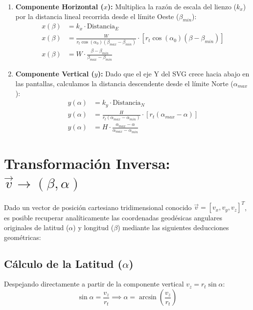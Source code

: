 \documentclass[12pt,a4paper]{article}
\begin{document}
\begin{enumerate}
    \item \textbf{Componente Horizontal ($x$):} Multiplica la razón de escala del lienzo ($k_x$) por la distancia lineal recorrida desde el límite Oeste ($\beta_{min}$):
    \begin{align}
        x(\beta) &= k_x \cdot \text{Distancia}_E \nonumber \\
        x(\beta) &= \frac{W}{r_t \cos(\alpha_0)(\beta_{max} - \beta_{min})} \cdot \left[ r_t \cos(\alpha_0)(\beta - \beta_{min}) \right] \nonumber \\
        x(\beta) &= W \cdot \frac{\beta - \beta_{min}}{\beta_{max} - \beta_{min}}
    \end{align}

    \item \textbf{Componente Vertical ($y$):} Dado que el eje Y del SVG crece hacia abajo en las pantallas, calculamos la distancia descendente desde el límite Norte ($\alpha_{max}$):
    \begin{align}
        y(\alpha) &= k_y \cdot \text{Distancia}_N \nonumber \\
        y(\alpha) &= \frac{H}{r_t (\alpha_{max} - \alpha_{min})} \cdot \left[ r_t (\alpha_{max} - \alpha) \right] \nonumber \\
        y(\alpha) &= H \cdot \frac{\alpha_{max} - \alpha}{\alpha_{max} - \alpha_{min}}
    \end{align}
\end{enumerate}

\section{Transformación Inversa: $\vec{v} \to (\beta, \alpha)$}

Dado un vector de posición cartesiano tridimensional conocido $\vec{v} = [v_x, v_y, v_z]^T$, es posible recuperar analíticamente las coordenadas geodésicas angulares originales de latitud ($\alpha$) y longitud ($\beta$) mediante las siguientes deducciones geométricas:

\subsection{Cálculo de la Latitud ($\alpha$)}
Despejando directamente a partir de la componente vertical $v_z = r_t \sin \alpha$:
\begin{equation}
    \sin \alpha = \frac{v_z}{r_t} \implies \alpha = \arcsin \left( \frac{v_z}{r_t} \right)
\end{equation}
\end{document}
